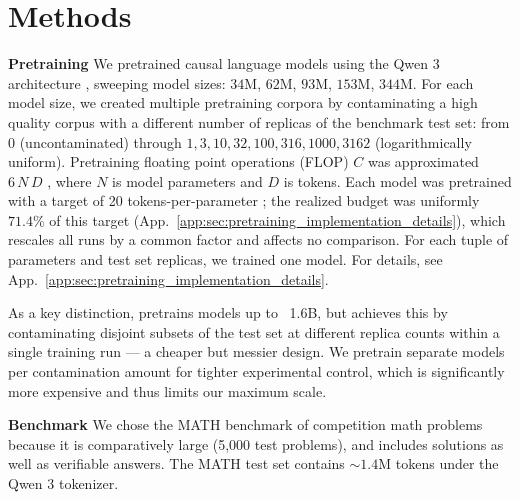 
\section{Methods}
\label{sec:methods}

\textbf{Pretraining} We pretrained causal language models \citep{vaswani2017attention, brown2020language} using the Qwen 3 architecture \citep{yang2025qwen3technicalreport}, sweeping model sizes: $34$M, $62$M, $93$M, $153$M, $344$M.
For each model size, we created multiple pretraining corpora by contaminating a high quality corpus \citep{penedo2024finewebdatasetsdecantingweb} with a different number of replicas of the benchmark test set: from $0$ (uncontaminated) through $1, 3, 10, 32, 100, 316, 1000, 3162$ (logarithmically uniform).
Pretraining floating point operations (FLOP) $C$ was approximated $ 6  \, N \, D$ \citep{kaplan2020scaling,sardana2024beyond,porian2024resolving,gadre2024languagemodelsscalereliably}, where $N$ is model parameters and $D$ is tokens.
Each model was pretrained with a target of 20 tokens-per-parameter \citep{hoffman2022chinchilla}; the realized budget was uniformly $71.4\%$ of this target (App.~\ref{app:sec:pretraining_implementation_details}), which rescales all runs by a common factor and affects no comparison.
For each tuple of parameters and test set replicas, we trained one model.
For details, see App.~\ref{app:sec:pretraining_implementation_details}.

As a key distinction, \citet{bordt2025howmuch} pretrains models up to ~1.6B, but achieves this by contaminating disjoint subsets of the test set at different replica counts within a single training run — a cheaper but messier design. We pretrain separate models per contamination amount for tighter experimental control, which is significantly more expensive and thus limits our maximum scale.

\textbf{Benchmark} We chose the MATH \citep{hendrycks2021measuringmathematicalproblemsolving} benchmark of competition math problems because it is comparatively large (5,000 test problems), and includes solutions as well as verifiable answers. 
The MATH test set contains $\mathord{\sim}1.4$M tokens under the Qwen 3 tokenizer.

